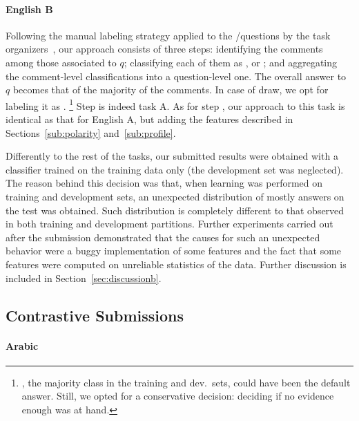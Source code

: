 \paragraph{English B}

Following the manual labeling strategy applied to the \yes/\no questions by the 
task organizers~\cite{Marquez-EtAl:2015:SemEval}, our approach 
consists of three steps:
\Ni identifying the \good comments among those associated to $q$;
\Nii classifying each of them as \yes, \no or \unsure; and 
\Niii aggregating the comment-level classifications into a question-level one. 
The overall answer to $q$ becomes that of the majority of the comments. In 
case of draw, we opt for labeling it as \unsure.%
\footnote{\yes, the majority class in the training and dev.\ sets, could have 
been the default answer. Still, we opted for a conservative decision: deciding 
\unsure if no evidence enough was at hand.}
Step \Ni is indeed task A. As for step \Nii, our approach to this task is 
identical as that for English A, but adding the features described in 
Sections~\ref{sub:polarity} and~\ref{sub:profile}.

Differently to the rest of the tasks, our submitted results were obtained with a 
classifier trained on the training data only (the development set was 
neglected). The reason behind this decision was that, when learning was performed on training and development sets,
an unexpected distribution of mostly \yes answers on the test was obtained. 
Such distribution is completely different to that observed in both training and development partitions. 
Further experiments carried out after the submission demonstrated that the causes for such an 
unexpected behavior were a buggy implementation of some features and the fact that 
some features were computed on unreliable statistics of the data. 
Further discussion is included in Section~\ref{sec:discussionb}.


\subsection{Contrastive Submissions}
\label{sub:contrastive}

\paragraph{Arabic} 

